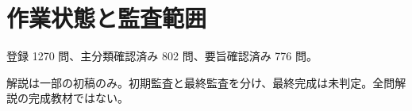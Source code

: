 \chapter{作業状態と監査範囲}
登録 1270 問、主分類確認済み 802 問、要旨確認済み 776 問。
\par 解説は一部の初稿のみ。初期監査と最終監査を分け、最終完成は未判定。全問解説の完成教材ではない。
